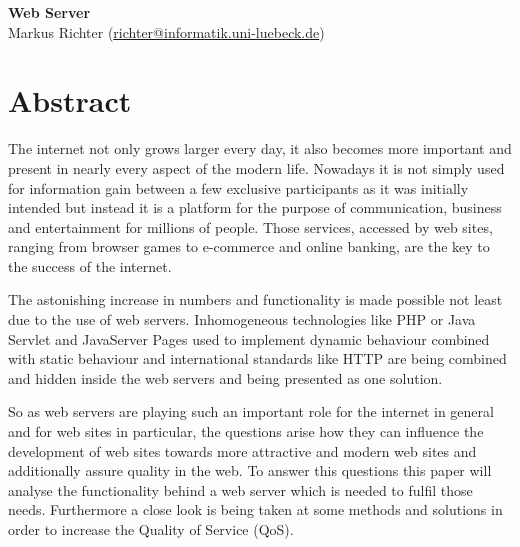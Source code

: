 \documentclass[
  a4paper,               %
  twoside,               %
  headings=small,        %
  DIV=12,                %
  BCOR=1cm,              %
  headinclude=true,      %
  footinclude=true,      %
  numbers=noenddot,      %
  11pt]{scrartcl}        %
\begin{document}
\begin{center}
\textbf{\huge Web Server} \\[1em]
Markus Richter (\url{richter@informatik.uni-luebeck.de})
\end{center}

\tableofcontents

\section*{Abstract}

The internet not only grows larger every day, it also becomes more important and present in nearly every aspect of the modern life. Nowadays it is not simply used for information gain between a few exclusive participants as it was initially intended but instead it is a platform for the purpose of communication, business and entertainment for millions of people. Those services, accessed by web sites, ranging from browser games to e-commerce and online banking, are the key to the success of the internet. \smallskip

The astonishing increase in numbers and functionality is made possible not least due to the use of web servers. Inhomogeneous technologies like PHP or Java Servlet and JavaServer Pages used to implement dynamic behaviour combined with static behaviour and international standards like HTTP are being combined and hidden inside the web servers and being presented as one solution. \smallskip

So as web servers are playing such an important role for the internet in general and for web sites in particular, the questions arise how they can influence the development of web sites towards more attractive and modern web sites and additionally assure quality in the web. To answer this questions this paper will analyse the functionality behind a web server which is needed to fulfil those needs. Furthermore a close look is being taken at some methods and solutions in order to increase the Quality of Service (QoS).
\end{document}

